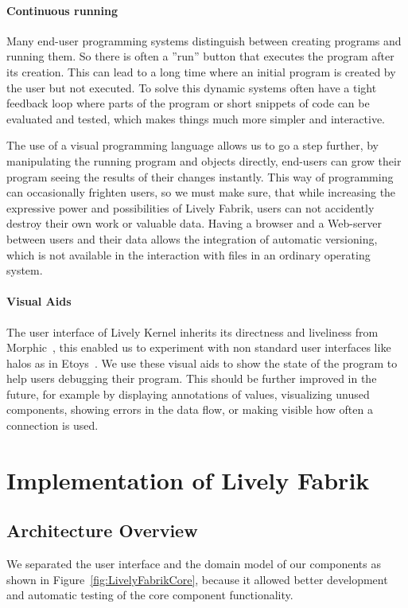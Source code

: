 \documentclass[pdftex, times, 10pt, twocolumn]{article}
\begin{document}
\paragraph{Continuous running}
Many end-user programming systems distinguish between creating programs and running them. So there is often a ''run'' button that executes the program after its creation. This can lead to a long time where an initial program is created by the user but not executed. To solve this dynamic systems often have a tight feedback loop where parts of the program or short snippets of code can be evaluated and tested, which makes things much more simpler and interactive. 

The use of a visual programming language allows us to go a step further, by manipulating the running program and objects directly, end-users can grow their program seeing the results of their changes instantly. This way of programming can occasionally frighten users, so we must make sure, that while increasing the expressive power and possibilities of Lively Fabrik, users can not accidently destroy their own work or valuable data. Having a browser and a Web-server between users and their data allows the integration of automatic versioning, which is not available in the interaction with files in an ordinary operating system.  



\paragraph{Visual Aids}
The user interface of Lively Kernel inherits its directness and liveliness from Morphic~\cite{Maloney1995DLM}, this enabled us to experiment with non standard user interfaces like halos as in Etoys~\cite{Kay2005SEA}. We use these  visual aids to show the state of the program to help users debugging their program. This should be further improved in the future, for example by displaying annotations of values, visualizing unused components, showing errors in the data flow, or making visible how often a connection is used. 



\section{Implementation of Lively Fabrik}


\subsection{Architecture Overview}
We separated the user interface and the domain model of our components as shown in Figure~\ref{fig:LivelyFabrikCore}, because it allowed better development and automatic testing of the core component functionality.  
\end{document}
